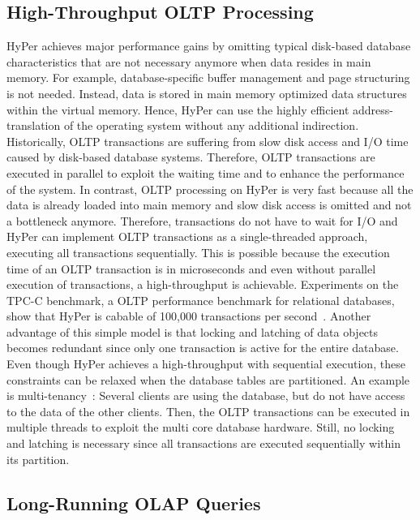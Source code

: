 \subsection{High-Throughput OLTP Processing}
HyPer achieves major performance gains by omitting typical disk-based database characteristics that are not necessary anymore when data resides in main memory. For example, database-specific buffer management and page structuring is not needed. Instead, data is stored in main memory optimized data structures within the virtual memory. Hence, HyPer can use the highly efficient address-translation of the operating system without any additional indirection.
\\
Historically, OLTP transactions are suffering from slow disk access and I/O time caused by disk-based database systems. Therefore, OLTP transactions are executed in parallel to exploit the waiting time and to enhance the performance of the system.
In contrast, OLTP processing on HyPer is very fast because all the data is already loaded into main memory and slow disk access is omitted and not a bottleneck anymore. Therefore, transactions do not have to wait for I/O and HyPer can implement OLTP transactions as a single-threaded approach, executing all transactions sequentially. This is possible because the execution time of an OLTP transaction is in microseconds and even without parallel execution of transactions, a high-throughput is achievable. Experiments on the TPC-C benchmark, a OLTP performance benchmark for relational databases, show that HyPer is cabable of 100,000 transactions per second~\parencite{brawnywimpy}. Another advantage of this simple model is that locking and latching of data objects becomes redundant since only one transaction is active for the entire database. 
\\
Even though HyPer achieves a high-throughput with sequential execution, these constraints can be relaxed when the database tables are partitioned. An example is multi-tenancy~\parencite{mt1}\parencite{mt2}: Several clients are using the database, but do not have access to the data of the other clients. Then, the OLTP transactions can be executed in multiple threads to exploit the multi core database hardware. Still, no locking and latching is necessary since all transactions are executed sequentially within its partition.

\subsection{Long-Running OLAP Queries}

